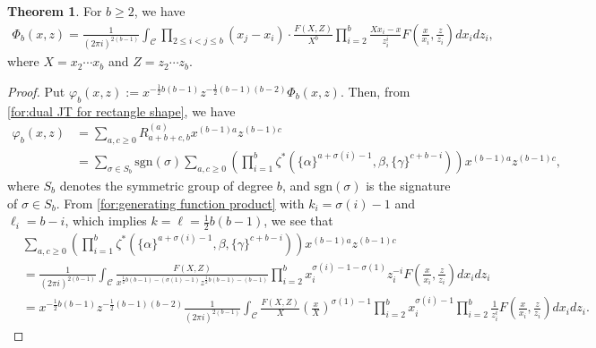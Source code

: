\documentclass[12pt]{amsart}%
\theoremstyle{definition}
\newtheorem{theorem}{Theorem}[section]
\begin{document}
\begin{theorem}
For $b\ge 2$, we have
\begin{align}
\label{for:generating function of R}
 \Phi_b(x,z)
=\frac{1}{(2\pi i)^{2(b-1)}}\int_{\mathcal{C}}
\prod_{2\le i<j\le b}(x_j-x_i)\cdot \frac{F(X,Z)}{X^b}
\prod^{b}_{i=2}\frac{Xx_i-x}{z^i_i}
F\left(\frac{x}{x_i},\frac{z}{z_i}\right)dx_idz_i,
\end{align}
where $X=x_2\cdots x_b$ and $Z=z_2\cdots z_b$.
\end{theorem}
\begin{proof}
Put $\varphi_b(x,z):=x^{-\frac{1}{2}b(b-1)}z^{-\frac{1}{2}(b-1)(b-2)}\Phi_b(x,z)$.
Then, from \eqref{for:dual JT for rectangle shape}, we have 
\begin{align*}
\varphi_b(x,z)
&=\sum_{a,c\ge 0}R^{(a)}_{a+b+c,b}x^{(b-1)a}z^{(b-1)c}\\
&=\sum_{\sigma\in S_b}\mathrm{sgn}(\sigma)\sum_{a,c\ge 0}\left(\prod^{b}_{i=1}\zeta^{\ast}(\{\alpha\}^{a+\sigma(i)-1},\beta,\{\gamma\}^{c+b-i})\right)x^{(b-1)a}z^{(b-1)c},
\end{align*}
where $S_b$ denotes the symmetric group of degree $b$, and $\mathrm{sgn}(\sigma)$ is the signature of $\sigma \in S_b$. 
From \eqref{for:generating function product} with $k_i=\sigma(i)-1$ and $\ell_i=b-i$, which implies  
$k=\ell=\frac{1}{2}b(b-1)$, we see that
\begin{align*}
&\sum_{a,c\ge 0}\left(\prod^{b}_{i=1}\zeta^{\ast}(\{\alpha\}^{a+\sigma(i)-1},\beta,\{\gamma\}^{c+b-i})\right)x^{(b-1)a}z^{(b-1)c}\\
&=\frac{1}{(2\pi i)^{2(b-1)}}\int_{\mathcal{C}}
\frac{F(X,Z)}{x^{\frac{1}{2}b(b-1)-(\sigma(1)-1)}z^{\frac{1}{2}b(b-1)-(b-1)}}\prod^{b}_{i=2}
x_i^{\sigma(i)-1-\sigma(1)}
z_i^{-i}
F\left(\frac{x}{x_i},\frac{z}{z_i}\right)dx_idz_i\\
&=x^{-\frac{1}{2}b(b-1)}z^{-\frac{1}{2}(b-1)(b-2)}
\frac{1}{(2\pi i)^{2(b-1)}}\int_{\mathcal{C}}
\frac{F(X,Z)}{X}\left(\frac{x}{X}\right)^{\sigma(1)-1}\prod^{b}_{i=2}
x_i^{\sigma(i)-1}
\prod^{b}_{i=2}\frac{1}{z^i_i}
F\left(\frac{x}{x_i},\frac{z}{z_i}\right)dx_idz_i.

\end{align*}
\end{proof}
\end{document}
